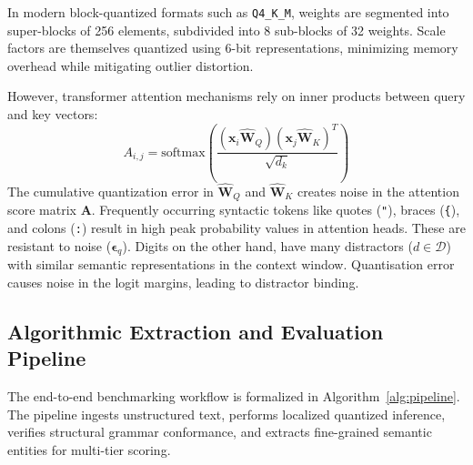 \documentclass[conference]{IEEEtran}
\begin{document}
{In modern block-quantized formats such as \texttt{Q4\_K\_M}, weights are segmented into super-blocks of 256 elements, subdivided into 8 sub-blocks of 32 weights. Scale factors are themselves quantized using 6-bit representations, minimizing memory overhead while mitigating outlier distortion. 

However, transformer attention mechanisms rely on inner products between query and key vectors:
\begin{equation}
A_{i,j} = \text{softmax}\left(\frac{(\mathbf{x}_i \hat{\mathbf{W}}_Q)(\mathbf{x}_j \hat{\mathbf{W}}_K)^T}{\sqrt{d_k}}\right)
\label{eq:attention}
\end{equation}
The cumulative quantization error in $\hat{\mathbf{W}}_Q$ and $\hat{\mathbf{W}}_K$ creates noise in the attention score matrix $\mathbf{A}$. Frequently occurring syntactic tokens like quotes (\texttt{"}), braces (\texttt{\{}), and colons (\texttt{:}) result in high peak probability values in attention heads. These are resistant to noise ($\boldsymbol{\epsilon}_q$). Digits on the other hand, have many distractors ($d \in \mathcal{D}$) with similar semantic representations in the context window. Quantisation error causes noise in the logit margins, leading to distractor binding.

\subsection{Algorithmic Extraction and Evaluation Pipeline}
The end-to-end benchmarking workflow is formalized in Algorithm~\ref{alg:pipeline}. The pipeline ingests unstructured text, performs localized quantized inference, verifies structural grammar conformance, and extracts fine-grained semantic entities for multi-tier scoring.

}
\end{document}
